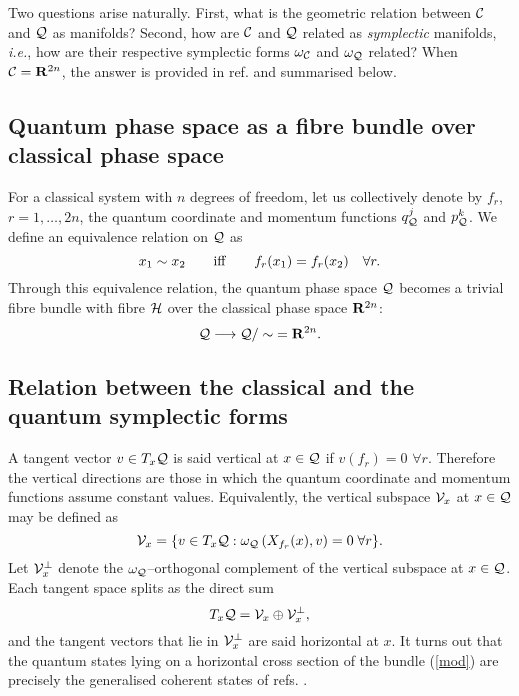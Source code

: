 \documentclass[a4paper,a4paper]{article}
\begin{document}
Two questions arise naturally. First, what is the geometric relation between ${\cal C}$ 
and ${\cal Q}$ as manifolds? Second, how are ${\cal C}$ and ${\cal Q}$ related as 
{\it symplectic} manifolds, {\it i.e.}, how are their respective symplectic forms 
$\omega_{\cal C}$ and $\omega_{\cal Q}$ related? When ${\cal C}={\bf R}^{2n}$, 
the answer is provided in ref. \cite{ASHTEKAR} and summarised below.

\subsection{Quantum phase space as a fibre bundle over classical phase space}\label{fibover}

For a classical system with $n$ degrees of freedom, let us collectively 
denote by $f_r$, $r=1,\ldots, 2n$, the quantum coordinate 
and momentum functions $q^j_{\cal Q}$ and $p^k_{\cal Q}$. 
We define an equivalence relation on ${\cal Q}$ as
\begin{equation}
x_1\sim x_2\qquad {\rm iff} \qquad f_r(x_1)=f_r(x_2)\quad \forall r.
\label{equival}
\end{equation}
Through this equivalence relation, the quantum phase space ${\cal Q}$ becomes 
a trivial fibre bundle with fibre ${\cal H}$ over the classical phase space 
${\bf R}^{2n}$:
\begin{equation}
{\cal Q}\longrightarrow {\cal Q}/\sim\;={\bf R}^{2n}.
\label{mod}
\end{equation} 

\subsection{Relation between the classical and the quantum symplectic forms}\label{hori}

A tangent vector $v\in T_x{\cal Q}$ is said vertical at $x\in{\cal Q}$ 
if $v(f_r)=0$ $\forall r$. Therefore the vertical directions are those 
in which the quantum coordinate and momentum functions assume constant values.
Equivalently, the vertical subspace ${\cal V}_x$ at $x\in{\cal Q}$ may be defined as
\begin{equation}
{\cal V}_x = \{v\in T_x{\cal Q}: \omega_{\cal Q}\left(X_{f_r}(x), 
v\right)=0\; \forall r\}.
\label{vvert}
\end{equation}
Let ${\cal V}_x^{\perp}$ denote the $\omega_{\cal Q}$--orthogonal 
complement of the vertical subspace at $x\in {\cal Q}$. Each tangent space 
splits as the direct sum
\begin{equation}
T_x{\cal Q}={\cal V}_x\oplus {\cal V}_x^{\perp},
\label{split}
\end{equation}
and the tangent vectors that lie in ${\cal V}_x^{\perp}$ are said horizontal at $x$. 
It turns out that the quantum states lying on a horizontal cross section of the 
bundle (\ref{mod}) are precisely the generalised coherent states of refs. 
\cite{COHST, PERELOMOV}.
\end{document}
